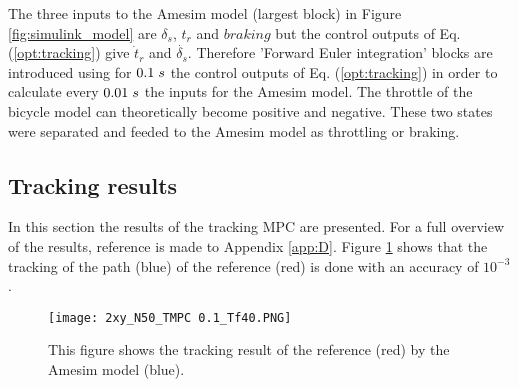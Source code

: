 The three inputs to the Amesim model (largest block)  in Figure \ref{fig:simulink_model} are $\delta_s$, $t_r$ and $braking$ but the control outputs of Eq. (\ref{opt:tracking}) give $\dot{t}_r$ and $\dot{\delta_s}$. Therefore 'Forward Euler integration' blocks are introduced using for $0.1\hspace{1mm}s$ the control outputs of Eq. (\ref{opt:tracking}) in order to calculate every $0.01\hspace{1mm}s$ the inputs for the Amesim model. The throttle of the bicycle model can theoretically become positive and negative. These two states were separated and feeded to the Amesim model as throttling or braking. 


\subsection{Tracking results} 
\label{s:tracking_results}

In this section the results of the tracking MPC are presented. For a full overview of the results, reference is made to Appendix \ref{app:D}. Figure \ref{fig:xy_mpc} shows that the tracking of the path (blue) of the reference (red) is done with an accuracy of $10^{-3}$. 

\begin{figure}[h!]
	\centering
	\texttt{[image: 2xy\_N50\_TMPC 0.1\_Tf40.PNG]}
	\caption{This figure shows the tracking result of the reference (red) by the Amesim model (blue).}	
	\label{fig:xy_mpc}
\end{figure}

